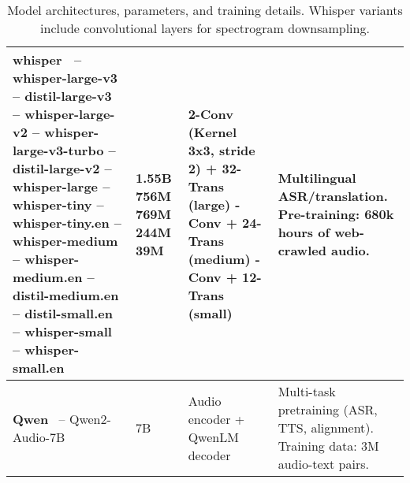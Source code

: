\begin{table*}[h!]
{\begin{tabular}{p{} p{} p{} p{}}
\textbf{whisper}~\cite{radford2022robustspeechrecognitionlargescale} \newline 
-- whisper-large-v3 \newline 
-- distil-large-v3 \newline 
-- whisper-large-v2 \newline 
-- whisper-large-v3-turbo \newline 
-- distil-large-v2 \newline 
-- whisper-large \newline 
-- whisper-tiny \newline 
-- whisper-tiny.en \newline 
-- whisper-medium \newline 
-- whisper-medium.en \newline 
-- distil-medium.en \newline 
-- distil-small.en \newline 
-- whisper-small \newline 
-- whisper-small.en & 
1.55B \newline 
756M \newline 
769M \newline 
244M \newline
39M &
2-Conv (Kernel 3x3, stride 2) + 32-Trans (large) \newline 
2-Conv + 24-Trans (medium) \newline 
2-Conv + 12-Trans (small) & 
Multilingual ASR/translation. \newline 
Pre-training: 680k hours of web-crawled audio. \\ \hline

\textbf{Qwen}~\cite{chu2024qwen2}\newline 
-- Qwen2-Audio-7B & 
7B & 
Audio encoder + QwenLM decoder & 
Multi-task pretraining (ASR, TTS, alignment). \newline 
Training data: 3M audio-text pairs. \\ \hline

\end{tabular}%
}
\caption{Model architectures, parameters, and training details. Whisper variants include convolutional layers for spectrogram downsampling.}
\label{tab:models}
\end{table*}
